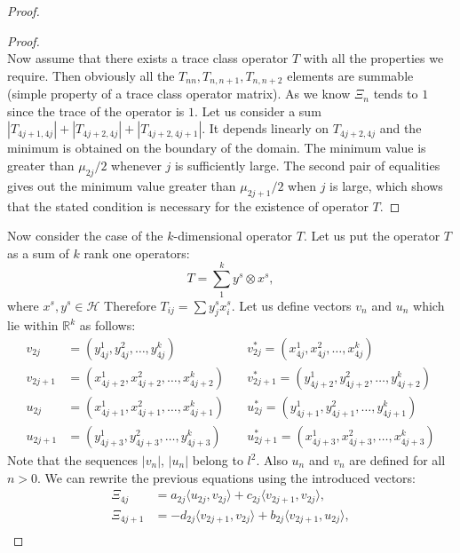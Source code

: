 \documentclass[12pt]{article}
\renewcommand{\cal}[1]{\mathcal{#1}}
\theoremstyle{definition}
\numberwithin{remark}{section}
\numberwithin{theorem}{section}
\numberwithin{prop}{section}
\numberwithin{equation}{section}
\numberwithin{lemma}{section}
\numberwithin{prop_under_lemma}{lemma}
\begin{document}
\begin{proof}
\begin{proof}
            \medskip\\
            Now assume that there exists a trace class operator $T$ with all the properties we require.
            Then obviously all the $T_{nn}, T_{n, n+1}, T_{n, n+2}$ elements are summable (simple property of
            a trace class operator matrix).
            As we know $\Xi_n$ tends to $1$ since the trace of the operator is $1$. Let us consider a sum
            $|T_{4j+1, 4j}| + |T_{4j+2,4j}| + |T_{4j+2,4j+1}|$. It depends linearly on $T_{4j+2, 4j}$ and the minimum
            is obtained on the boundary of the domain. The minimum value is greater than $\mu_{2j}/2$ whenever $j$ is
            sufficiently large.
            The second pair of equalities gives out the minimum value greater than $\mu_{2j+1}/2$ when $j$ is large,
            which shows that the stated condition is necessary for the existence of operator $T$.
        \end{proof}
        Now consider the case of the $k$-dimensional operator $T$.
        Let us put the operator $T$ as a sum of $k$ rank one operators:
        $$
            T = \sum_1^k y^s \otimes x^s,
        $$
        where $x^s, y^s \in \cal{H}$
        Therefore $T_{ij} = \sum {y^s_j x^s_i}$.
        Let us define vectors $v_n$ and $u_n$ which lie within $\mathbb{R}^k$ as follows:
        \begin{align*}
            v_{2j} &= (y^1_{4j}, y^2_{4j}, \dots ,y^k_{4j}) \quad
            &v^*_{2j} = (x^1_{4j}, x^2_{4j}, \dots ,x^k_{4j}) \\
            v_{2j+1} &= (x^1_{4j+2}, x^2_{4j+2}, \dots ,x^k_{4j+2}) \quad
            &v^*_{2j+1} = (y^1_{4j+2}, y^2_{4j+2}, \dots ,y^k_{4j+2}) \\
            u_{2j} &= (x^1_{4j+1}, x^2_{4j+1}, \dots ,x^k_{4j+1}) \quad
            &u^*_{2j} = (y^1_{4j+1}, y^2_{4j+1}, \dots ,y^k_{4j+1}) \\
            u_{2j+1} &= (y^1_{4j+3}, y^2_{4j+3}, \dots ,y^k_{4j+3}) \quad
            &u^*_{2j+1} = (x^1_{4j+3}, x^2_{4j+3}, \dots ,x^k_{4j+3}) 
        \end{align*}
        Note that the sequences $|v_n|$, $|u_n|$ belong to $l^2$. Also $u_n$ and $v_n$ are defined for all $n > 0$.
        We can rewrite the previous equations using the introduced vectors:
        \begin{align*}
            \Xi_{4j} &= a_{2j} \langle u_{2j}, v_{2j}\rangle + c_{2j} \langle v_{2j+1}, v_{2j}\rangle,\\
            \Xi_{4j + 1} &= -d_{2j} \langle v_{2j+1}, v_{2j}\rangle + b_{2j} \langle v_{2j+1}, u_{2j}\rangle,\\

\end{align*}
\end{proof}
\end{document}
